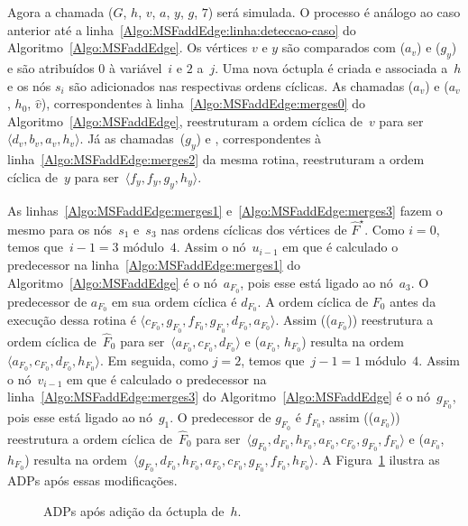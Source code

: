 Agora a chamada \MSFaddEdge($G$, $h$, $v$, $a$, $y$, $g$, $7$) será simulada.
O processo é análogo ao caso anterior até a linha~\ref{Algo:MSFaddEdge:linha:deteccao-caso} do Algoritmo~\ref{Algo:MSFaddEdge}.
Os vértices $v$ e $y$ são comparados com \LCOFindNode($a_v$) e \LCOFindNode($g_y$) e são atribuídos $0$ à variável~$i$ e $2$ a~$j$.
Uma nova óctupla é criada e associada a~$h$ e os nós $s_i$ são adicionados nas respectivas ordens cíclicas.
As chamadas \LCOCycle($a_v$) e \LCOMerge($a_v$, $h_0$, $\hat v$), correspondentes à linha~\ref{Algo:MSFaddEdge:merges0} do Algoritmo~\ref{Algo:MSFaddEdge}, reestruturam a ordem cíclica de~$v$ para ser $\langle d_v, b_v, a_v, h_v \rangle$.
Já as chamadas~\LCOCycle($g_y$) e , correspondentes à linha~\ref{Algo:MSFaddEdge:merges2} da mesma rotina, reestruturam a ordem cíclica de~$y$ para ser~$\langle f_y, f_y, g_y, h_y \rangle$.


As linhas~\ref{Algo:MSFaddEdge:merges1} e~\ref{Algo:MSFaddEdge:merges3} fazem o mesmo para os nós~$s_1$ e~$s_3$ nas ordens cíclicas dos vértices de $\hat F^\star$.
Como $i=0$, temos que~$i-1 = 3$ módulo~$4$.
Assim o nó~$u_{i-1}$ em que é calculado o predecessor na linha~\ref{Algo:MSFaddEdge:merges1} do Algoritmo~\ref{Algo:MSFaddEdge} é o nó~$a_{F_0}$, pois esse está ligado ao nó~$a_3$.
O predecessor de $a_{F_0}$ em sua ordem cíclica é $d_{F_0}$.
A ordem cíclica de $F_0$ antes da execução dessa rotina é $\langle c_{F_0}, g_{F_0}, f_{F_0}, g_{F_0}, d_{F_0}, a_{F_0} \rangle$.
Assim \LCOCycle(\treapPredecessor($a_{F_0}$)) reestrutura a ordem cíclica de~$\hat F_0$ para ser~$\langle a_{F_0}, c_{F_0}, d_{F_0}\rangle$ e \LCOMerge($a_{F_0}$, $h_{F_0}$) resulta na ordem $\langle a_{F_0}, c_{F_0}, d_{F_0}, h_{F_0}\rangle$.
Em seguida, como $j=2$, temos que~$j-1 = 1$ módulo~$4$.
Assim o nó~$v_{i-1}$ em que é calculado o predecessor na linha~\ref{Algo:MSFaddEdge:merges3} do Algoritmo~\ref{Algo:MSFaddEdge} é o nó~$g_{F_0}$, pois esse está ligado ao nó~$g_1$.
O predecessor de $g_{F_0}$ é $f_{F_0}$, assim \LCOCycle(\treapPredecessor($a_{F_0}$)) reestrutura a ordem cíclica de~$\hat F_0$ para ser~$\langle g_{F_0}, d_{F_0}, h_{F_0}, a_{F_0}, c_{F_0}, g_{F_0}, f_{F_0}\rangle$ e \LCOMerge($a_{F_0}$, $h_{F_0}$) resulta na ordem~$\langle g_{F_0}, d_{F_0}, h_{F_0}, a_{F_0}, c_{F_0}, g_{F_0}, f_{F_0}, h_{F_0}\rangle$.
A Figura~\ref{fig:MSF-adiciona-nao-ponte-1} ilustra as ADPs após essas modificações.

\begin{figure}[htb]
\scalebox{.9}{

}
\caption{ADPs após adição da óctupla de~$h$.}
\label{fig:MSF-adiciona-nao-ponte-1}
\end{figure}

